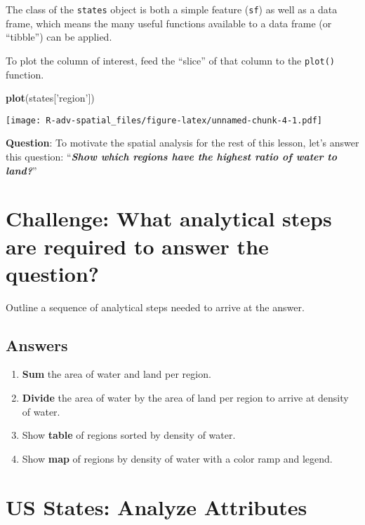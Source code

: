 \documentclass[]{book}
\newenvironment{Shaded}{\begin{snugshade}}{\end{snugshade}}
\newcommand{\KeywordTok}[1]{\textcolor[rgb]{0.13,0.29,0.53}{\textbf{{#1}}}}
\newcommand{\StringTok}[1]{\textcolor[rgb]{0.31,0.60,0.02}{{#1}}}
\newcommand{\NormalTok}[1]{{#1}}
\providecommand{\tightlist}{%
  \setlength{\itemsep}{0pt}\setlength{\parskip}{0pt}}
\begin{document}
The class of the \texttt{states} object is both a simple feature
(\texttt{sf}) as well as a data frame, which means the many useful
functions available to a data frame (or ``tibble'') can be applied.

To plot the column of interest, feed the ``slice'' of that column to the
\texttt{plot()} function.

\begin{Shaded}
\begin{Highlighting}[]
\KeywordTok{plot}\NormalTok{(states[}\StringTok{'region'}\NormalTok{])}
\end{Highlighting}
\end{Shaded}

\texttt{[image: R-adv-spatial\_files/figure-latex/unnamed-chunk-4-1.pdf]}

\textbf{Question}: To motivate the spatial analysis for the rest of this
lesson, let's answer this question: ``\emph{\textbf{Show which regions
have the highest ratio of water to land?}}''

\section{Challenge: What analytical steps are required to answer the
question?}\label{challenge-what-analytical-steps-are-required-to-answer-the-question}

Outline a sequence of analytical steps needed to arrive at the answer.

\subsection{Answers}\label{answers}

\begin{enumerate}
\def\labelenumi{\arabic{enumi}.}
\tightlist
\item
  \textbf{Sum} the area of water and land per region.
\item
  \textbf{Divide} the area of water by the area of land per region to
  arrive at density of water.
\item
  Show \textbf{table} of regions sorted by density of water.
\item
  Show \textbf{map} of regions by density of water with a color ramp and
  legend.
\end{enumerate}

\section{US States: Analyze
Attributes}\label{us-states-analyze-attributes}
\end{document}
